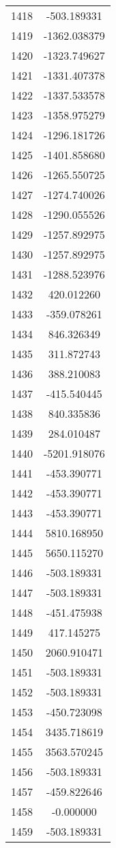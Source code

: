 \documentclass[12pt]{article}
\begin{document}
\begin{longtable}{@{}cc@{}}
1418 & -503.189331 \\
1419 & -1362.038379 \\
1420 & -1323.749627 \\
1421 & -1331.407378 \\
1422 & -1337.533578 \\
1423 & -1358.975279 \\
1424 & -1296.181726 \\
1425 & -1401.858680 \\
1426 & -1265.550725 \\
1427 & -1274.740026 \\
1428 & -1290.055526 \\
1429 & -1257.892975 \\
1430 & -1257.892975 \\
1431 & -1288.523976 \\
1432 & 420.012260 \\
1433 & -359.078261 \\
1434 & 846.326349 \\
1435 & 311.872743 \\
1436 & 388.210083 \\
1437 & -415.540445 \\
1438 & 840.335836 \\
1439 & 284.010487 \\
1440 & -5201.918076 \\
1441 & -453.390771 \\
1442 & -453.390771 \\
1443 & -453.390771 \\
1444 & 5810.168950 \\
1445 & 5650.115270 \\
1446 & -503.189331 \\
1447 & -503.189331 \\
1448 & -451.475938 \\
1449 & 417.145275 \\
1450 & 2060.910471 \\
1451 & -503.189331 \\
1452 & -503.189331 \\
1453 & -450.723098 \\
1454 & 3435.718619 \\
1455 & 3563.570245 \\
1456 & -503.189331 \\
1457 & -459.822646 \\
1458 & -0.000000 \\
1459 & -503.189331 \\

\end{longtable}
\end{document}
